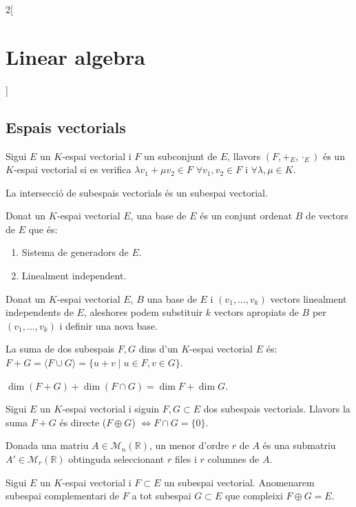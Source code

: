 \documentclass[../../../main.tex]{subfiles}
\begin{document}
\begin{multicols}{2}[\section{Linear algebra}]
\subsection{Espais vectorials}
\begin{definition}
Sigui $E$ un $K$-espai vectorial i $F$ un subconjunt de $E$, llavors $(F,+_E,\cdot_E)$ és un $K$-espai vectorial si es verifica $\lambda v_1+\mu v_2\in F$ $\forall v_1,v_2\in F$ i $\forall\lambda,\mu\in K$.
\end{definition}
\begin{lemma}
La intersecció de subespais vectorials és un subespai vectorial.
\end{lemma}
\begin{definition}
Donat un $K$-espai vectorial $E$, una base de $E$ és un conjunt ordenat $B$ de vectors de $E$ que és: 
\begin{enumerate}
    \item Sistema de generadors de $E$.
    \item Linealment independent.
\end{enumerate}
\end{definition}
\begin{theorem}
Donat un $K$-espai vectorial $E$, $B$ una base de $E$ i $(v_1,\ldots,v_k)$ vectors linealment independents de $E$, aleshores podem substituir $k$ vectors apropiats de $B$ per $(v_1,\ldots,v_k)$ i definir una nova base.
\end{theorem}
\begin{definition}
La suma de dos subespais $F,G$ dins d'un $K$-espai vectorial $E$ és: $F+G=\langle F\cup G\rangle=\{u+v\mid u\in F,v\in G\}$.
\end{definition}
\begin{prop}
$\dim (F+G)+\dim(F\cap G)=\dim F+\dim G$.
\end{prop}
\begin{definition}
Sigui $E$ un $K$-espai vectorial i siguin $F,G\subset E$ dos subespais vectorials. Llavors la suma $F+G$ és directe ($F\oplus G$) $\iff F\cap G=\{0\}$.
\end{definition}
\begin{definition}
Donada una matriu $A\in\mathcal{M}_n(\mathbb{R})$, un menor d'ordre $r$ de $A$ és una submatriu $A'\in\mathcal{M}_r(\mathbb{R})$ obtinguda seleccionant $r$ files i $r$ columnes de $A$.
\end{definition}
\begin{definition}
Sigui $E$ un $K$-espai vectorial i $F\subset E$ un subespai vectorial. Anomenarem subespai complementari de $F$ a tot subespai $G\subset E$ que compleixi $F\oplus G=E$.

\end{definition}
\end{multicols}
\end{document}
